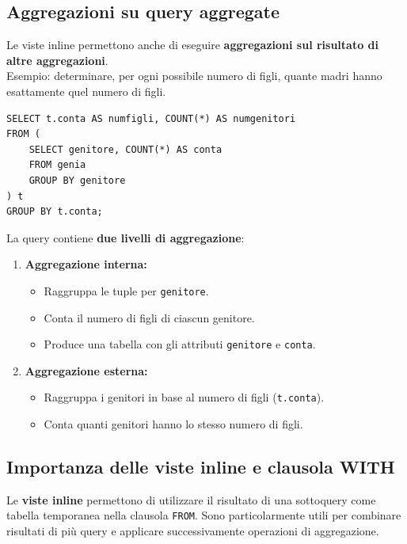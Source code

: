 \subsection{Aggregazioni su query aggregate}
Le viste inline permettono anche di eseguire
\textbf{aggregazioni sul risultato di altre aggregazioni}.\\
\textcolor{verdeEsempio}{Esempio:} determinare, per ogni possibile numero
di figli, quante madri hanno esattamente quel numero di figli.
\begin{verbatim}
SELECT t.conta AS numfigli, COUNT(*) AS numgenitori
FROM (
    SELECT genitore, COUNT(*) AS conta
    FROM genia
    GROUP BY genitore
) t
GROUP BY t.conta;
\end{verbatim}
La query contiene \textbf{due livelli di aggregazione}:
\begin{enumerate}
    \item \textbf{Aggregazione interna:}
    \begin{itemize}
        \item Raggruppa le tuple per \texttt{genitore}.
        \item Conta il numero di figli di ciascun genitore.
        \item Produce una tabella con gli attributi
        \texttt{genitore} e \texttt{conta}.
    \end{itemize}
    \item \textbf{Aggregazione esterna:}
    \begin{itemize}
        \item Raggruppa i genitori in base al numero
        di figli (\texttt{t.conta}).
        \item Conta quanti genitori hanno lo stesso
        numero di figli.
    \end{itemize}
\end{enumerate}

\subsection{Importanza delle viste inline e clausola WITH}
Le \textbf{viste inline} permettono di utilizzare il risultato
di una sottoquery come tabella temporanea nella clausola \texttt{FROM}.
Sono particolarmente utili per combinare risultati di più query
e applicare successivamente operazioni di aggregazione.
